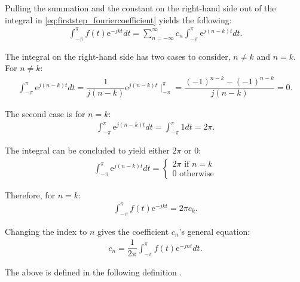 Pulling the summation and the constant on the right-hand side out of the integral in \eqref{eq:firststep_fouriercoefficient} yields the following:
\begin{align*}
\int_{-\pi}^\pi f(t) \text{e}^{-j k t}dt = \sum_{n=-\infty}^\infty c_n \int_{-\pi}^\pi \text{e}^{j (n-k) t}dt.
\end{align*}

The integral on the right-hand side has two cases to consider, $n \neq k$ and $n = k$. For $n\neq k$:
\begin{align*}
	\int_{-\pi}^\pi \text{e}^{j(n-k)t}dt 
	=\dfrac{1}{j(n-k)}\text{e}^{j(n-k)t}\mid_{-\pi}^{\pi}
	=\dfrac{(-1)^{n-k}-(-1)^{n-k}}{j(n-k)}
	=0.
\end{align*}

The second case is for $n = k$:
\begin{align*}
\int_{-\pi}^\pi \text{e}^{j(n-k)t}dt = \int_{-\pi}^\pi 1 dt = 2\pi.
\end{align*}

The integral can be concluded to yield either $2\pi$ or $0$:
\begin{align}
	\int_{-\pi}^{\pi} \text{e}^{j (n-k)t}dt 
	= 
	\begin{cases}
			2\pi \text{ if } n=k\\
			0 \text{ otherwise}
	\end{cases}
\end{align}

Therefore, for $n = k$:
\begin{align*}
\int_{-\pi}^\pi f(t)\text{e}^{-j k t} = 2\pi c_k.
\end{align*}

Changing the index to $n$ gives the coefficient $c_n$'s general equation:
\begin{align*}
	c_n = \dfrac{1}{2\pi} \int_{-\pi}^{\pi} f(t) \text{e}^{-j n t}dt.
\end{align*}

The above is defined in the following definition \cite{page 18-20, FAA}.

